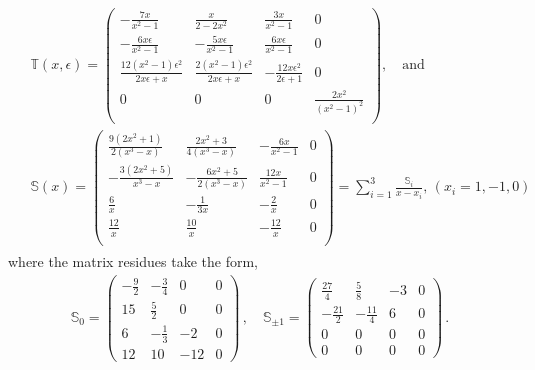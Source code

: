 \begin{align}
\begin{split}
   &\mathbb{T}(x,\epsilon)= \left(
\begin{array}{cccc}
 -\frac{7 x}{x^2-1} & \frac{x}{2-2 x^2} & \frac{3 x}{x^2-1} & 0 \\
 -\frac{6 x \epsilon }{x^2-1} & -\frac{5 x \epsilon }{x^2-1} & \frac{6 x \epsilon }{x^2-1} & 0 \\
 \frac{12 \left(x^2-1\right) \epsilon ^2}{2 x \epsilon +x} & \frac{2 \left(x^2-1\right) \epsilon ^2}{2 x \epsilon +x} & -\frac{12 x \epsilon ^2}{2 \epsilon +1} & 0 \\
 0 & 0 & 0 & \frac{2 x^2}{\left(x^2-1\right)^2} \\
\end{array}
\right),\quad\textrm{and}\\ &
\mathbb{S}(x)=
\left(
\begin{array}{cccc}
 \frac{9 \left(2 x^2+1\right)}{2 \left(x^3-x\right)} & \frac{2 x^2+3}{4 \left(x^3-x\right)} & -\frac{6 x}{x^2-1} & 0 \\
 -\frac{3 \left(2 x^2+5\right)}{x^3-x} & -\frac{6 x^2+5}{2 \left(x^3-x\right)} & \frac{12 x}{x^2-1} & 0 \\
 \frac{6}{x} & -\frac{1}{3 x} & -\frac{2}{x} & 0 \\
 \frac{12}{x} & \frac{10}{x} & -\frac{12}{x} & 0 \\
\end{array}
\right)=\sum_{i=1}^3\frac{\mathbb{S}_i}{x-x_i},\,(x_i=1,-1,0)
\end{split}
\end{align}
where the matrix residues take the form,
\begin{align}
\mathbb{S}_0=\left(\begin{array}{cccc}
         -  \frac{9}{2}  & -\frac{3}{4}& 0 &0  \\
            15 & \frac{5}{2} & 0 &0\\
            6&-\frac{1}{3}&-2&0\\
            12 & 10 & -12 &0 
     \end{array}
     \right)\,, \quad    
    \mathbb{S}_{\pm 1}=\left(\begin{array}{cccc}
           \frac{27}{4}  & \frac{5}{8}& -3 &0  \\
            -\frac{21}{2} & -\frac{11}{4} & 6 &0\\
            0&0&0&0\\
            0 & 0 & 0 &0 
     \end{array}
     \right)\,.  \label{2.17} 
\end{align}
